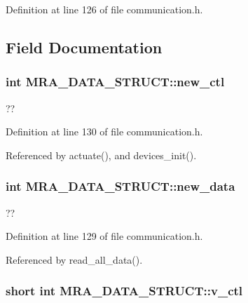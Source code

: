 Definition at line 126 of file communication.\-h.



\subsection{Field Documentation}
\hypertarget{structMRA__DATA__STRUCT_a5b1af89ee717f5b14c18e8ac12e93e75}{
\subsubsection[{new\-\_\-ctl}]{\setlength{\rightskip}{0pt plus 5cm}int M\-R\-A\-\_\-\-D\-A\-T\-A\-\_\-\-S\-T\-R\-U\-C\-T\-::new\-\_\-ctl}}\label{structMRA__DATA__STRUCT_a5b1af89ee717f5b14c18e8ac12e93e75}


?? 



Definition at line 130 of file communication.\-h.



Referenced by actuate(), and devices\-\_\-init().

\hypertarget{structMRA__DATA__STRUCT_afca6e851d302f3a786885a4e1eec79d7}{
\subsubsection[{new\-\_\-data}]{\setlength{\rightskip}{0pt plus 5cm}int M\-R\-A\-\_\-\-D\-A\-T\-A\-\_\-\-S\-T\-R\-U\-C\-T\-::new\-\_\-data}}\label{structMRA__DATA__STRUCT_afca6e851d302f3a786885a4e1eec79d7}


?? 



Definition at line 129 of file communication.\-h.



Referenced by read\-\_\-all\-\_\-data().

\hypertarget{structMRA__DATA__STRUCT_a64b4e6bb604e58de593a60c87942b966}{
\subsubsection[{v\-\_\-ctl}]{\setlength{\rightskip}{0pt plus 5cm}short int M\-R\-A\-\_\-\-D\-A\-T\-A\-\_\-\-S\-T\-R\-U\-C\-T\-::v\-\_\-ctl}}\label{structMRA__DATA__STRUCT_a64b4e6bb604e58de593a60c87942b966}


